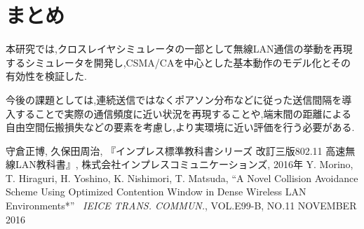 \documentclass[a4paper, 10pt]{ltjsarticle}
\begin{document}
\section{まとめ}
本研究では,クロスレイヤシミュレータの一部として無線LAN通信の挙動を再現するシミュレータを開発し,CSMA/CAを中心とした基本動作のモデル化とその有効性を検証した.

今後の課題としては,連続送信ではなくポアソン分布などに従った送信間隔を導入することで実際の通信頻度に近い状況を再現することや,端末間の距離による自由空間伝搬損失などの要素を考慮し,より実環境に近い評価を行う必要がある.




\begin{thebibliography}{9}
  守倉正博, 久保田周治, 『インプレス標準教科書シリーズ 改訂三版802.11 高速無線LAN教科書』, 株式会社インプレスコミュニケーションズ, 2016年
  Y. Morino, T. Hiraguri, H. Yoshino, K. Nishimori, T. Matsuda, ``A Novel Collision Avoidance Scheme Using Optimized Contention Window in Dense Wireless LAN Environments*'' \, \textit{IEICE TRANS. COMMUN.}, VOL.E99-B, NO.11 NOVEMBER 2016
\end{thebibliography}
\end{document}
